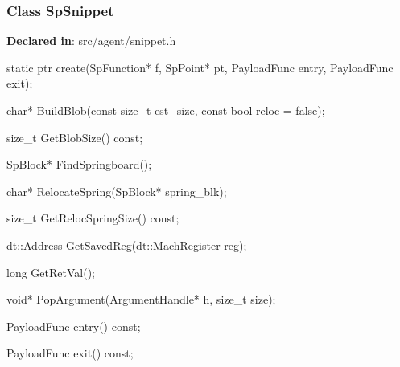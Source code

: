 \subsubsection{Class SpSnippet}
\textbf{Declared in}: src/agent/snippet.h

\begin{apient}
static ptr create(SpFunction* f,
                  SpPoint* pt,
                  PayloadFunc entry,
                  PayloadFunc exit);
\end{apient}

\begin{apient}
char* BuildBlob(const size_t est_size,
                const bool reloc = false);
\end{apient}
\apidesc{
}

\begin{apient}
size_t GetBlobSize() const;
\end{apient}
\apidesc{
}

\begin{apient}
SpBlock* FindSpringboard();
\end{apient}
\apidesc{
}

\begin{apient}
char* RelocateSpring(SpBlock* spring_blk);
\end{apient}
\apidesc{
}

\begin{apient}
size_t GetRelocSpringSize() const;
\end{apient}
\apidesc{
}

\begin{apient}
dt::Address GetSavedReg(dt::MachRegister reg);
\end{apient}
\apidesc{
}

\begin{apient}
long GetRetVal();
\end{apient}
\apidesc{
}

\begin{apient}
void* PopArgument(ArgumentHandle* h, size_t size);
\end{apient}
\apidesc{
}

\begin{apient}
PayloadFunc entry() const;
\end{apient}
\apidesc{
}

\begin{apient}
PayloadFunc exit() const;
\end{apient}
\apidesc{
}

